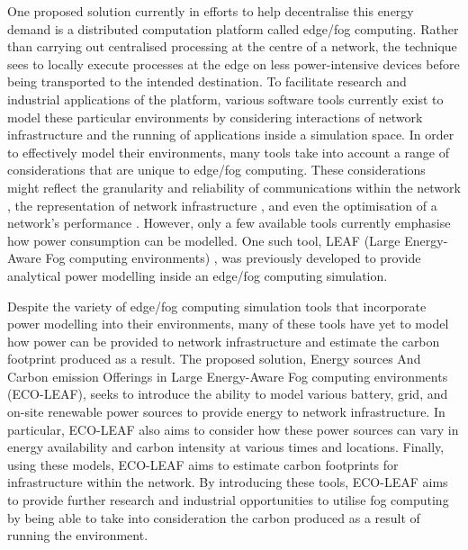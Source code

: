 \documentclass{l4proj}
\begin{document}
One proposed solution currently in efforts to help decentralise this energy demand is a distributed computation platform called edge/fog computing.
Rather than carrying out centralised processing at the centre of a network, the technique sees to locally execute processes at the edge on less power-intensive devices before being transported to the intended destination.
To facilitate research and industrial applications of the platform, various software tools currently exist to model these particular environments by considering interactions of network infrastructure and the running of applications inside a simulation space.
In order to effectively model their environments, many tools take into account a range of considerations that are unique to edge/fog computing.
These considerations might reflect the granularity and reliability of communications within the network \citep{FogNetSim}, the representation of network infrastructure \citep{ENIGMA}, and even the optimisation of a network's performance \citep{EdgeCloudSim}.
However, only a few available tools currently emphasise how power consumption can be modelled.
One such tool, LEAF (Large Energy-Aware Fog computing environments) \citep{leaf2021}, was previously developed to provide analytical power modelling inside an edge/fog computing simulation.

Despite the variety of edge/fog computing simulation tools that incorporate power modelling into their environments, many of these tools have yet to model how power can be provided to network infrastructure and estimate the carbon footprint produced as a result.
The proposed solution, Energy sources And Carbon emission Offerings in Large Energy-Aware Fog computing environments (ECO-LEAF), seeks to introduce the ability to model various battery, grid, and on-site renewable power sources to provide energy to network infrastructure.
In particular, ECO-LEAF also aims to consider how these power sources can vary in energy availability and carbon intensity at various times and locations.
Finally, using these models, ECO-LEAF aims to estimate carbon footprints for infrastructure within the network.
By introducing these tools, ECO-LEAF aims to provide further research and industrial opportunities to utilise fog computing by being able to take into consideration the carbon produced as a result of running the environment.

\end{document}
